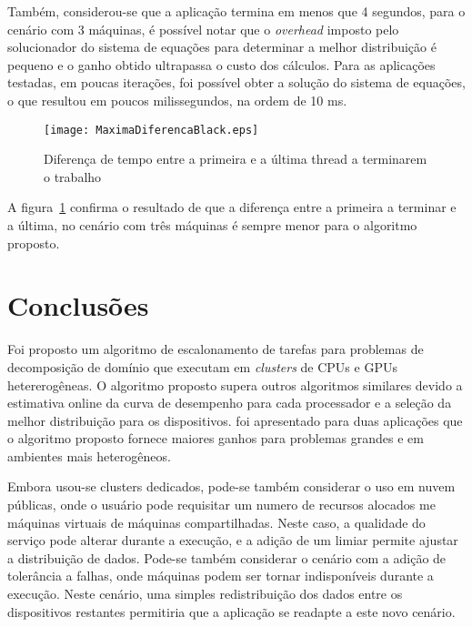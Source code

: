Também, considerou-se que a aplicação termina em menos que 4 segundos, para o cenário com 3 máquinas, é possível notar que o \emph{overhead} imposto pelo solucionador do sistema de equações para determinar a melhor distribuição é pequeno e o ganho obtido ultrapassa o custo dos cálculos. Para as aplicações testadas, em poucas iterações, foi possível obter a solução do sistema de equações, o que resultou em poucos milissegundos, na ordem de 10 ms.

\begin{figure}[htb]
	\begin{center}
	\centering
			\texttt{[image: MaximaDiferencaBlack.eps]}
	\caption{Diferença de tempo entre a primeira e a última thread a terminarem o trabalho}
	\label{fig:diferencaThreadsBlack}
	\end{center}
\end{figure}

A figura~\ref{fig:diferencaThreadsBlack} confirma o resultado de que a diferença entre a primeira a terminar  e a última, no cenário com três máquinas é sempre menor para o algoritmo proposto.


\section{Conclusões}\label{cap6:conclusao}

Foi proposto um algoritmo de escalonamento de tarefas para problemas de decomposição de domínio que executam em \emph{clusters} de CPUs e GPUs hetererogêneas. O algoritmo proposto supera outros algoritmos similares devido a estimativa online da curva de desempenho para cada  processador e a seleção da melhor distribuição para os dispositivos. foi apresentado para duas aplicações que o algoritmo proposto fornece maiores ganhos para problemas grandes e em ambientes mais heterogêneos.

Embora usou-se clusters dedicados, pode-se também considerar o uso em nuvem públicas, onde o usuário pode requisitar um numero de recursos alocados me máquinas virtuais de máquinas compartilhadas. Neste caso, a qualidade do serviço pode alterar durante a execução, e a adição de um limiar permite ajustar a distribuição de dados. Pode-se também considerar o cenário com a adição de tolerância a falhas, onde máquinas podem ser tornar indisponíveis durante a execução. Neste cenário, uma simples redistribuição dos dados entre os dispositivos restantes permitiria que a aplicação se readapte a este novo cenário.





